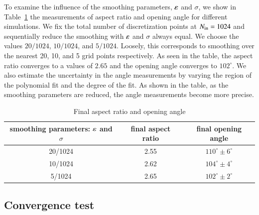 \documentclass[preprint, 10pt]{elsarticle}
\begin{document}
To examine the influence of the smoothing parameters, $\varepsilon$ and $\sigma$, we show in Table~\ref{table:arangle} the measurements of aspect ratio and opening angle for different simulations. We fix the total number of discretization points at $N_{\mathrm{in}} = 1024$ and sequentially reduce the smoothing with $\varepsilon$ and $\sigma$ always equal. We choose the values $20/1024$, $10/1024$, and $5/1024$. 
Loosely, this corresponds to smoothing over the nearest 20, 10, and 5 grid points respectively. As seen in the table, the aspect ratio converges to a values of $2.65$ and the opening angle converges to $102^{\circ}$. We also estimate the uncertainty in the angle measurements by varying the region of the polynomial fit and the degree of the fit. As shown in the table, as the smoothing parameters are reduced, the angle measurements become more precise.

\begin{table}%
\begin{center}
\caption{Final aspect ratio and opening angle
} 
\vspace{0.3 pc}
\label{table:arangle}
\begin{tabular}{c c c}
\hline
\hspace{0.5pc} smoothing parameters: $\varepsilon$ and $\sigma$
\hspace{0.5pc} & final aspect ratio 
\hspace{0.5pc} & final opening angle \\
\hline
20/1024		& 2.55	& $110^\circ \pm 6^\circ$	\\
10/1024		& 2.62	& $104^\circ \pm 4^\circ$	\\
5/1024		& 2.65	& $102^\circ \pm 2^\circ$	\\
\hline
\end{tabular}
\end{center}
\end{table}


\subsection{Convergence test}
\end{document}
